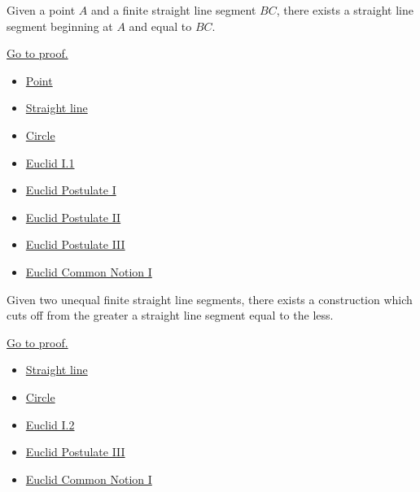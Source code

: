 \begin{theorem}
\label{thm:euclid-i-2}
Given a point $A$ and a finite straight line segment $BC$, there exists a
straight line segment beginning at $A$ and equal to $BC$.
\end{theorem}
\begin{remark*}[Proof]
\hyperref[prf:euclid-i-2]{Go to proof.}
\end{remark*}
\begin{lra-not-visible}
\begin{dependencies}
\begin{itemize}
  \item \hyperref[def-euclid-point]{Point}
  \item \hyperref[def-euclid-straight-line]{Straight line}
  \item \hyperref[def-euclid-circle]{Circle}
  \item \hyperref[thm:euclid-i-1]{Euclid I.1}
  \item \hyperref[ax-euclid-postulate-draw-straight-line]{Euclid Postulate I}
  \item \hyperref[ax-euclid-postulate-produce-straight-line]{Euclid Postulate II}
  \item \hyperref[ax-euclid-postulate-describe-circle]{Euclid Postulate III}
  \item \hyperref[ax-euclid-common-notion-things-equal-to-same]{Euclid Common Notion I}
\end{itemize}
\end{dependencies}
\end{lra-not-visible}

\begin{theorem}
\label{thm:euclid-i-3}
Given two unequal finite straight line segments, there exists a construction
which cuts off from the greater a straight line segment equal to the less.
\end{theorem}
\begin{remark*}[Proof]
\hyperref[prf:euclid-i-3]{Go to proof.}
\end{remark*}
\begin{lra-not-visible}
\begin{dependencies}
\begin{itemize}
  \item \hyperref[def-euclid-straight-line]{Straight line}
  \item \hyperref[def-euclid-circle]{Circle}
  \item \hyperref[thm:euclid-i-2]{Euclid I.2}
  \item \hyperref[ax-euclid-postulate-describe-circle]{Euclid Postulate III}
  \item \hyperref[ax-euclid-common-notion-things-equal-to-same]{Euclid Common Notion I}
\end{itemize}
\end{dependencies}
\end{lra-not-visible}
